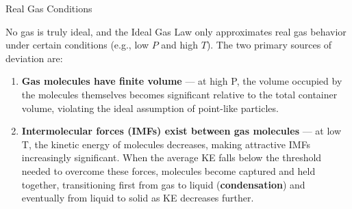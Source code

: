 \documentclass[10pt]{article}
\begin{document}
  \begin{core}{Real Gas Conditions}

    No gas is truly ideal, and the Ideal Gas Law only approximates real gas behavior under certain conditions (e.g., low $P$ and high $T$). The two primary sources of deviation are:

    \begin{enumerate}

      \item \textbf{Gas molecules have finite volume} --- at high P, the volume occupied by the molecules themselves becomes significant relative to the total container volume, violating the ideal assumption of point-like particles.

      \item \textbf{Intermolecular forces (IMFs) exist between gas molecules} --- at low T, the kinetic energy of molecules decreases, making attractive IMFs increasingly significant. When the average KE falls below the threshold needed to overcome these forces, molecules become captured and held together, transitioning first from gas to liquid (\textbf{condensation}) and eventually from liquid to solid as KE decreases further.
        
    \end{enumerate}


  \end{core}
\end{document}
